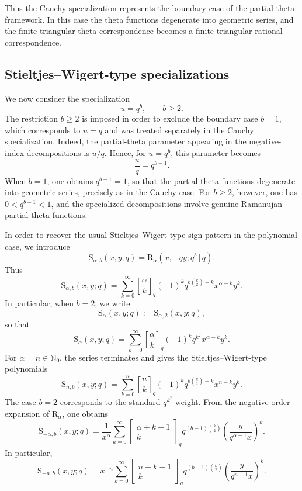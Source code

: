 \documentclass[12pt]{article}
\newcommand{\qbinom}{\genfrac{[}{]}{0pt}{}}
\newcommand{\s}{\mathrm{S}}
\newcommand{\rr}{\mathrm{R}}
\begin{document}
Thus the Cauchy specialization represents the boundary case of the partial-theta framework. In this case the theta functions degenerate into geometric series, and the finite triangular theta correspondence becomes a finite triangular rational correspondence.


\subsection{Stieltjes--Wigert-type specializations}

We now consider the specialization \[ u=q^b,\qquad b\geq 2. \] The restriction \(b\geq2\) is imposed in order to exclude the boundary case \(b=1\), which corresponds to \(u=q\) and was treated separately in the Cauchy specialization. Indeed, the partial-theta parameter appearing in the negative-index decompositions is \(u/q\). Hence, for \(u=q^b\), this parameter becomes \[ \frac{u}{q}=q^{b-1}. \] When \(b=1\), one obtains \(q^{b-1}=1\), so that the partial theta functions degenerate into geometric series, precisely as in the Cauchy case. For \(b\geq2\), however, one has \(0<q^{b-1}<1\), and the specialized decompositions involve genuine Ramanujan partial theta functions.

In order to recover the usual Stieltjes--Wigert-type sign pattern in the polynomial case, we introduce 
\[ 
\s_{\alpha,b}(x,y;q) = \rr_{\alpha}(x,-qy;q^b\,|\,q). 
\] 
Thus 
\[ 
\s_{\alpha,b}(x,y;q) = \sum_{k=0}^{\infty} \qbinom{\alpha}{k}_{q} (-1)^k q^{b\binom{k}{2}+k} x^{\alpha-k}y^k . 
\] 
In particular, when \(b=2\), we write 
\[ 
\s_{\alpha}(x,y;q):=\s_{\alpha,2}(x,y;q), 
\] 
so that 
\[ 
\s_{\alpha}(x,y;q) = \sum_{k=0}^{\infty}\qbinom{\alpha}{k}_{q} (-1)^k q^{k^2}x^{\alpha-k}y^k . 
\] 
For \(\alpha=n\in\mathbb N_0\), the series terminates and gives the Stieltjes--Wigert-type polynomials 
\[ 
\s_{n,b}(x,y;q) = \sum_{k=0}^{n} \qbinom{n}{k}_{q} (-1)^k q^{b\binom{k}{2}+k} x^{n-k}y^k . 
\] 
The case \(b=2\) corresponds to the standard \(q^{k^2}\)-weight.
From the negative-order expansion of \(\rr_{\alpha}\), one obtains 
\[ 
\s_{-\alpha,b}(x,y;q) = \frac{1}{x^\alpha} \sum_{k=0}^{\infty} \begin{bmatrix} \alpha+k-1\\ k \end{bmatrix}_{q} q^{(b-1)\binom{k}{2}} \left( \frac{y}{q^{\alpha-1}x} \right)^k . 
\] 
In particular, 
\[ 
\s_{-n,b}(x,y;q) = x^{-n} \sum_{k=0}^{\infty} \begin{bmatrix} n+k-1\\ k \end{bmatrix}_{q} q^{(b-1)\binom{k}{2}} \left( \frac{y}{q^{n-1}x} \right)^k . 
\]
\end{document}
